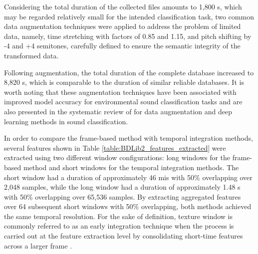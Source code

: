 Considering the total duration of the collected files amounts to 1,800 \gls{s}, which may be regarded relatively small for the intended classification task, two common data augmentation techniques were applied to address the problem of limited data, namely, time stretching with factors of 0.85 and 1.15, and pitch shifting by -4 and +4 semitones, carefully defined to ensure the semantic integrity of the transformed data. 

Following augmentation, the total duration of the complete database increased to 8,820 \gls{s}, which is comparable to the duration of similar reliable databases. It is worth noting that these augmentation techniques have been associated with improved model accuracy for environmental sound classification tasks \cite{Salamon2017} and are also presented in the systematic review of \textcite{Alli2022} for data augmentation and deep learning methods in sound classification.

In order to compare the frame-based method with temporal integration methods, several features shown in Table \ref{table:BDLib2_features_extracted} were extracted using two different window configurations: long windows for the frame-based method and short windows for the temporal integration methods. The short window had a duration of approximately 46 \gls{mi}\gls{s} with 50\% overlapping over 2,048 samples, while the long window had a duration of approximately 1.48 \gls{s} with 50\% overlapping over 65,536 samples. By extracting aggregated features over 64 subsequent short windows with 50\% overlapping, both methods achieved the same temporal resolution. For the sake of definition, 
texture window is commonly referred to as an early integration technique when the process is carried out at the feature extraction level by consolidating short-time features across a larger frame \cite{Bountourakis2019}.


